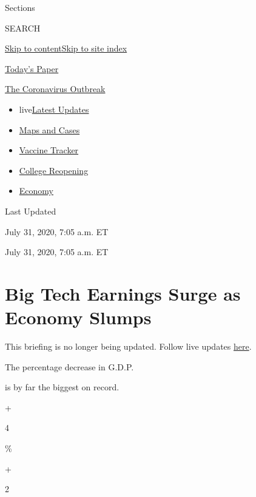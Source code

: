 Sections

SEARCH

\protect\hyperlink{site-content}{Skip to
content}\protect\hyperlink{site-index}{Skip to site index}

\href{https://myaccount.nytimes.com/auth/login?response_type=cookie\&client_id=vi}{}

\href{https://www.nytimes.com/section/todayspaper}{Today's Paper}

\href{https://www.nytimes.com/news-event/coronavirus}{The Coronavirus
Outbreak}

\begin{itemize}
\tightlist
\item
  live\href{https://www.nytimes.com/2020/08/04/world/coronavirus-covid-19.html}{Latest
  Updates}
\item
  \href{https://www.nytimes.com/interactive/2020/us/coronavirus-us-cases.html}{Maps
  and Cases}
\item
  \href{https://www.nytimes.com/interactive/2020/science/coronavirus-vaccine-tracker.html}{Vaccine
  Tracker}
\item
  \href{https://www.nytimes.com/2020/08/02/us/covid-college-reopening.html}{College
  Reopening}
\item
  \href{https://www.nytimes.com/live/2020/08/03/business/stock-market-today-coronavirus}{Economy}
\end{itemize}

Last Updated

July 31, 2020, 7:05 a.m. ET

July 31, 2020, 7:05 a.m. ET

\hypertarget{big-tech-earnings-surge-as-economy-slumps}{%
\section{Big Tech Earnings Surge as Economy
Slumps}\label{big-tech-earnings-surge-as-economy-slumps}}

This briefing is no longer being updated. Follow live updates
\href{https://www.nytimes.com/live/2020/07/31/business/stock-market-today-coronavirus}{here}.

The percentage decrease in G.D.P.

is by far the biggest on record.

+

4

\%

+

2

